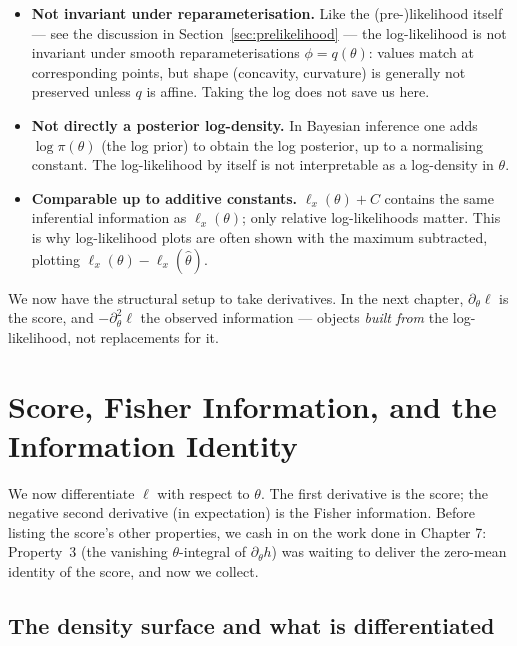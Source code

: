 \documentclass[a4paper,oneside,12pt]{extarticle}
\theoremstyle{plain}
\theoremstyle{definition}
\theoremstyle{remark}
\begin{document}
\begin{itemize}
\item \textbf{Not invariant under reparameterisation.}
  Like the (pre-)likelihood itself --- see the discussion in
  Section~\ref{sec:prelikelihood} --- the log-likelihood is not
  invariant under smooth reparameterisations $\phi = q(\theta)$:
  values match at corresponding points, but shape (concavity,
  curvature) is generally not preserved unless $q$ is affine.
  Taking the log does not save us here.

\item \textbf{Not directly a posterior log-density.}
  In Bayesian inference one adds $\log \pi(\theta)$ (the log prior)
  to obtain the log posterior, up to a normalising constant.  The
  log-likelihood by itself is not interpretable as a log-density in
  $\theta$.

\item \textbf{Comparable up to additive constants.}
  $\ell_x(\theta) + C$ contains the same inferential information as
  $\ell_x(\theta)$; only relative log-likelihoods matter.  This is
  why log-likelihood plots are often shown with the maximum
  subtracted, plotting $\ell_x(\theta) - \ell_x(\hat\theta)$.
\end{itemize}

We now have the structural setup to take derivatives.  In the next
chapter, $\partial_\theta \ell$ is the score, and
$-\partial_\theta^2 \ell$ the observed information --- objects
\emph{built from} the log-likelihood, not replacements for it.

\section{Score, Fisher Information, and the Information Identity}
\label{sec:score_fisher_chapter}

We now differentiate $\ell$ with respect to $\theta$.  The first
derivative is the score; the negative second derivative (in
expectation) is the Fisher information.  Before listing the score's
other properties, we cash in on the work done in Chapter 7: Property~3
(the vanishing $\theta$-integral of $\partial_\theta h$) was waiting
to deliver the zero-mean identity of the score, and now we collect.

\subsection{The density surface and what is differentiated}
\end{document}
